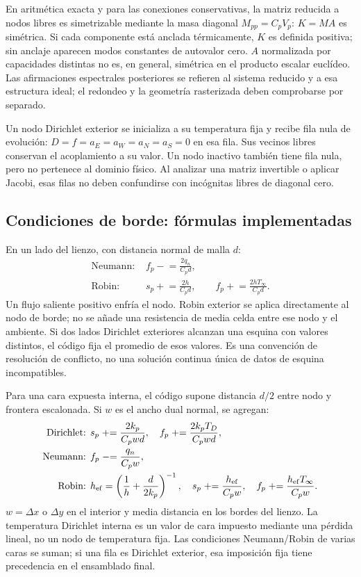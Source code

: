 \documentclass[11pt,a4paper]{article}
\begin{document}
En aritmética exacta y para las conexiones conservativas, la matriz reducida
a nodos libres es simetrizable mediante la masa diagonal $M_{pp}=C_pV_p$:
$K=MA$ es simétrica. Si cada componente está anclada térmicamente, $K$ es
definida positiva; sin anclaje aparecen modos constantes de autovalor cero.
$A$ normalizada por capacidades distintas no es, en general, simétrica en el
producto escalar euclídeo. Las afirmaciones espectrales posteriores se refieren
al sistema reducido y a esa estructura ideal; el redondeo y la geometría
rasterizada deben comprobarse por separado.

Un nodo Dirichlet exterior se inicializa a su temperatura fija y recibe fila
nula de evolución: $D=f=a_E=a_W=a_N=a_S=0$ en esa fila. Sus vecinos libres
conservan el acoplamiento a su valor. Un nodo inactivo también tiene fila nula,
pero no pertenece al dominio físico. Al analizar una matriz invertible o aplicar
Jacobi, esas filas no deben confundirse con incógnitas libres de diagonal cero.

\subsection{Condiciones de borde: fórmulas implementadas}
\label{sec:bc}
En un lado del lienzo, con distancia normal de malla $d$:
\begin{align}
\text{Neumann: }& f_p\mathrel{-}=\frac{2q_n}{C_pd},\\
\text{Robin: }&s_p\mathrel{+}=\frac{2h}{C_pd},\qquad
 f_p\mathrel{+}=\frac{2hT_\infty}{C_pd}.
\end{align}
Un flujo saliente positivo enfría el nodo. Robin exterior se aplica directamente
al nodo de borde; no se añade una resistencia de media celda entre ese nodo
y el ambiente. Si dos lados Dirichlet exteriores alcanzan una esquina con
valores distintos, el código fija el promedio de esos valores. Es una
convención de resolución de conflicto, no una solución continua única de
datos de esquina incompatibles.

Para una cara expuesta interna, el código supone distancia $d/2$ entre nodo y
frontera escalonada. Si $w$ es el ancho dual normal, se agregan:
\begin{align}
\text{Dirichlet: }&s_p\mathrel{+}=\frac{2k_p}{C_pwd},\quad
 f_p\mathrel{+}=\frac{2k_pT_D}{C_pwd},\\
\text{Neumann: }&f_p\mathrel{-}=\frac{q_n}{C_pw},\\
\text{Robin: }&h_{\rm ef}=\left(\frac1h+\frac{d}{2k_p}\right)^{-1},\quad
 s_p\mathrel{+}=\frac{h_{\rm ef}}{C_pw},\quad
 f_p\mathrel{+}=\frac{h_{\rm ef}T_\infty}{C_pw}.
 \label{eq:cutrobin}
\end{align}
$w=\Delta x$ o $\Delta y$ en el interior y media distancia en los bordes del
lienzo. La temperatura Dirichlet interna es un valor de cara impuesto mediante
una pérdida lineal, no un nodo de temperatura fija. Las condiciones
Neumann/Robin de varias caras se suman; si una fila es Dirichlet exterior,
esa imposición fija tiene precedencia en el ensamblado final.
\end{document}
